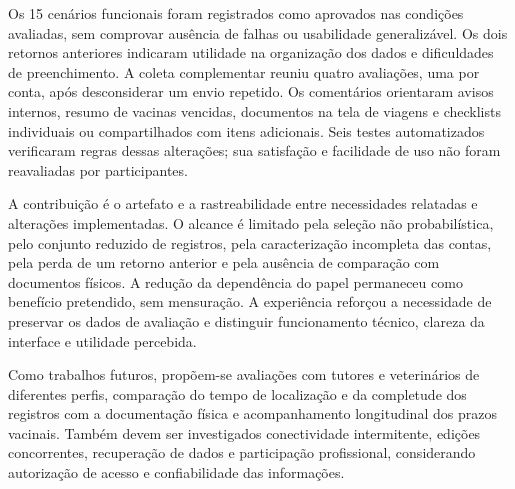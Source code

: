 \documentclass{UNESC}
\begin{document}
Os 15 cenários funcionais foram registrados como aprovados nas condições avaliadas, sem comprovar ausência de falhas ou usabilidade generalizável. Os dois retornos anteriores indicaram utilidade na organização dos dados e dificuldades de preenchimento. A coleta complementar reuniu quatro avaliações, uma por conta, após desconsiderar um envio repetido. Os comentários orientaram avisos internos, resumo de vacinas vencidas, documentos na tela de viagens e checklists individuais ou compartilhados com itens adicionais. Seis testes automatizados verificaram regras dessas alterações; sua satisfação e facilidade de uso não foram reavaliadas por participantes.

A contribuição é o artefato e a rastreabilidade entre necessidades relatadas e alterações implementadas. O alcance é limitado pela seleção não probabilística, pelo conjunto reduzido de registros, pela caracterização incompleta das contas, pela perda de um retorno anterior e pela ausência de comparação com documentos físicos. A redução da dependência do papel permaneceu como benefício pretendido, sem mensuração. A experiência reforçou a necessidade de preservar os dados de avaliação e distinguir funcionamento técnico, clareza da interface e utilidade percebida.

Como trabalhos futuros, propõem-se avaliações com tutores e veterinários de diferentes perfis, comparação do tempo de localização e da completude dos registros com a documentação física e acompanhamento longitudinal dos prazos vacinais. Também devem ser investigados conectividade intermitente, edições concorrentes, recuperação de dados e participação profissional, considerando autorização de acesso e confiabilidade das informações.


\renewcommand{\refname}{REFERÊNCIAS}

\end{document}
